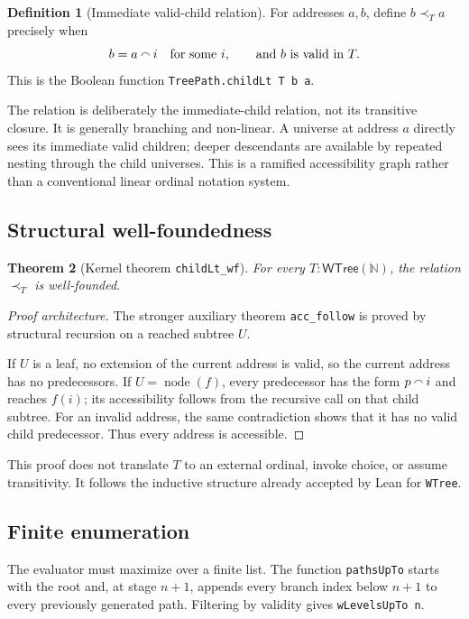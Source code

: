 \documentclass[11pt]{article}
\newtheorem{theorem}{Theorem}[section]
\theoremstyle{definition}
\newtheorem{definition}[theorem]{Definition}
\theoremstyle{remark}
\newcommand{\WTree}{\mathsf{WTree}}
\begin{document}
\begin{definition}[Immediate valid-child relation]
For addresses $a,b$, define $b\prec_T a$ precisely when
\[
  b=a\mathbin{\raisebox{0.15ex}{$\smallfrown$}}i
  \quad\text{for some }i,
  \qquad\text{and }b\text{ is valid in }T.
\]
This is the Boolean function \texttt{TreePath.childLt T b a}.
\end{definition}

The relation is deliberately the immediate-child relation, not its transitive
closure.  It is generally branching and non-linear.  A universe at address
$a$ directly sees its immediate valid children; deeper descendants are
available by repeated nesting through the child universes.  This is a
ramified accessibility graph rather than a conventional linear ordinal
notation system.

\subsection{Structural well-foundedness}

\begin{theorem}[Kernel theorem \texttt{childLt\_wf}]
For every $T:\WTree(\mathbb N)$, the relation $\prec_T$ is well-founded.
\end{theorem}

\begin{proof}[Proof architecture]
The stronger auxiliary theorem \texttt{acc\_follow} is proved by structural
recursion on a reached subtree $U$.

If $U$ is a leaf, no extension of the current address is valid, so the current
address has no predecessors.  If $U=\operatorname{node}(f)$, every predecessor
has the form $p\mathbin{\raisebox{0.15ex}{$\smallfrown$}}i$ and reaches $f(i)$;
its accessibility follows from the recursive call on that child subtree.
For an invalid address, the same contradiction shows that it has no valid
child predecessor.  Thus every address is accessible.
\end{proof}

This proof does not translate $T$ to an external ordinal, invoke choice, or
assume transitivity.  It follows the inductive structure already accepted by
Lean for \texttt{WTree}.

\subsection{Finite enumeration}

The evaluator must maximize over a finite list.  The function
\texttt{pathsUpTo} starts with the root and, at stage $n+1$, appends every
branch index below $n+1$ to every previously generated path.  Filtering by
validity gives \texttt{wLevelsUpTo n}.
\end{document}
